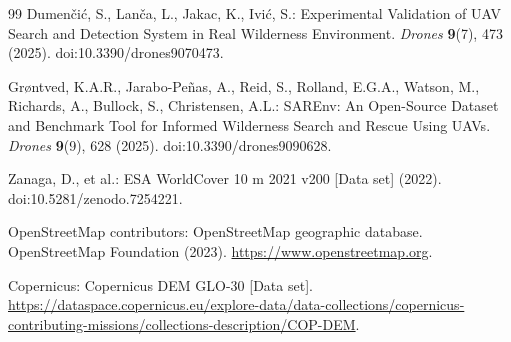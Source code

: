\documentclass[12pt,a4paper]{article}
\begin{document}
\begin{thebibliography}{99}
Dumenčić, S., Lanča, L., Jakac, K., Ivić, S.:
Experimental Validation of UAV Search and Detection System in Real Wilderness Environment.
\emph{Drones} \textbf{9}(7), 473 (2025).
doi:10.3390/drones9070473.

Grøntved, K.A.R., Jarabo-Peñas, A., Reid, S., Rolland, E.G.A., Watson, M., Richards, A., Bullock, S., Christensen, A.L.:
SAREnv: An Open-Source Dataset and Benchmark Tool for Informed Wilderness Search and Rescue Using UAVs.
\emph{Drones} \textbf{9}(9), 628 (2025).
doi:10.3390/drones9090628.

Zanaga, D., et al.:
ESA WorldCover 10 m 2021 v200 [Data set] (2022).
doi:10.5281/zenodo.7254221.

OpenStreetMap contributors:
OpenStreetMap geographic database.
OpenStreetMap Foundation (2023).
\url{https://www.openstreetmap.org}.

Copernicus:
Copernicus DEM GLO-30 [Data set].
\url{https://dataspace.copernicus.eu/explore-data/data-collections/copernicus-contributing-missions/collections-description/COP-DEM}.

\end{thebibliography}
\end{document}
